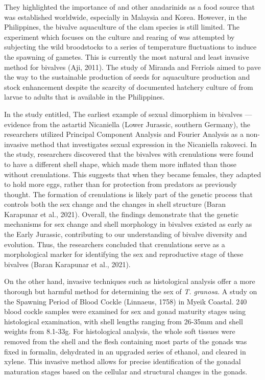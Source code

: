 They highlighted the importance of \Tgranosa and other anadarinids as a food source that was established worldwide, especially in Malaysia and Korea. However, in the Philippines, the bivalve aquaculture of the clam species is still limited. The experiment which focuses on the culture and rearing of \Tgranosa was attempted by subjecting the wild broodstocks to a series of temperature fluctuations to induce the spawning of gametes. This is currently the most natural and least invasive method for bivalves (Aji, 2011). The study of Miranda and Ferriols aimed to pave the way to the sustainable production of \Tgranosa seeds for aquaculture production and stock enhancement despite the scarcity of documented hatchery culture of \Tgranosa from larvae to adults that is available in the Philippines.

In the study entitled, The earliest example of sexual dimorphism in bivalves — evidence from the astartid Nicaniella (Lower Jurassic, southern Germany), the researchers utilized Principal Component Analysis and Fourier Analysis as a non-invasive method that investigates sexual expression in the Nicaniella rakoveci. In the study, researchers discovered that the bivalves with crenulations were found to have a different shell shape, which made them more inflated than those without crenulations. This suggests that when they became females, they adapted to hold more eggs, rather than for protection from predators as previously thought. The formation of crenulations is likely part of the genetic process that controls both the sex change and the changes in shell structure (Baran Karapunar et al., 2021). Overall, the findings demonstrate that the genetic mechanisms for sex change and shell morphology in bivalves existed as early as the Early Jurassic, contributing to our understanding of bivalve diversity and evolution. Thus, the researchers concluded that crenulations serve as a morphological marker for identifying the sex and reproductive stage of these bivalves  (Baran Karapunar et al., 2021).

On the other hand, invasive techniques such as histological analysis offer a more thorough but harmful method for determining the sex of \textit{T. granosa}. A study on the Spawning Period of Blood Cockle \Tegillarcagranosa (Linnaeus, 1758) in Myeik Coastal. 240 blood cockle samples were examined for sex and gonad maturity stages using histological examination, with shell lengths ranging from 26-35mm and shell weights from 8.1-33g. For histological analysis, the whole soft tissues were removed from the shell and the flesh containing most parts of the gonads was fixed in formalin, dehydrated in an upgraded series of ethanol, and cleared in xylene. This invasive method allows for precise identification of the gonadal maturation stages based on the cellular and structural changes in the gonads.

